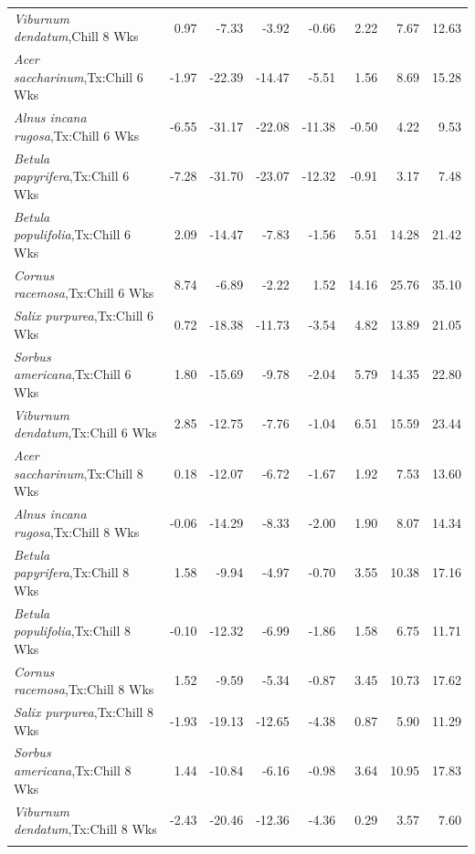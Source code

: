 \documentclass{article}\usepackage[]{graphicx}\usepackage[]{color}
\begin{document}
\begin{longtable}{lrrrrrrr}
  \textit{Viburnum dendatum},Chill 8 Wks & 0.97 & -7.33 & -3.92 & -0.66 & 2.22 & 7.67 & 12.63 \\ 
  \textit{Acer saccharinum},Tx:Chill 6 Wks & -1.97 & -22.39 & -14.47 & -5.51 & 1.56 & 8.69 & 15.28 \\ 
  \textit{Alnus incana rugosa},Tx:Chill 6 Wks & -6.55 & -31.17 & -22.08 & -11.38 & -0.50 & 4.22 & 9.53 \\ 
  \textit{Betula papyrifera},Tx:Chill 6 Wks & -7.28 & -31.70 & -23.07 & -12.32 & -0.91 & 3.17 & 7.48 \\ 
  \textit{Betula populifolia},Tx:Chill 6 Wks & 2.09 & -14.47 & -7.83 & -1.56 & 5.51 & 14.28 & 21.42 \\ 
  \textit{Cornus racemosa},Tx:Chill 6 Wks & 8.74 & -6.89 & -2.22 & 1.52 & 14.16 & 25.76 & 35.10 \\ 
  \textit{Salix purpurea},Tx:Chill 6 Wks & 0.72 & -18.38 & -11.73 & -3.54 & 4.82 & 13.89 & 21.05 \\ 
  \textit{Sorbus americana},Tx:Chill 6 Wks & 1.80 & -15.69 & -9.78 & -2.04 & 5.79 & 14.35 & 22.80 \\ 
  \textit{Viburnum dendatum},Tx:Chill 6 Wks & 2.85 & -12.75 & -7.76 & -1.04 & 6.51 & 15.59 & 23.44 \\ 
  \textit{Acer saccharinum},Tx:Chill 8 Wks & 0.18 & -12.07 & -6.72 & -1.67 & 1.92 & 7.53 & 13.60 \\ 
  \textit{Alnus incana rugosa},Tx:Chill 8 Wks & -0.06 & -14.29 & -8.33 & -2.00 & 1.90 & 8.07 & 14.34 \\ 
  \textit{Betula papyrifera},Tx:Chill 8 Wks & 1.58 & -9.94 & -4.97 & -0.70 & 3.55 & 10.38 & 17.16 \\ 
  \textit{Betula populifolia},Tx:Chill 8 Wks & -0.10 & -12.32 & -6.99 & -1.86 & 1.58 & 6.75 & 11.71 \\ 
  \textit{Cornus racemosa},Tx:Chill 8 Wks & 1.52 & -9.59 & -5.34 & -0.87 & 3.45 & 10.73 & 17.62 \\ 
  \textit{Salix purpurea},Tx:Chill 8 Wks & -1.93 & -19.13 & -12.65 & -4.38 & 0.87 & 5.90 & 11.29 \\ 
  \textit{Sorbus americana},Tx:Chill 8 Wks & 1.44 & -10.84 & -6.16 & -0.98 & 3.64 & 10.95 & 17.83 \\ 
  \textit{Viburnum dendatum},Tx:Chill 8 Wks & -2.43 & -20.46 & -12.36 & -4.36 & 0.29 & 3.57 & 7.60 \\ 
   \hline
\hline
\label{tab:suppmodht}
\end{longtable}
\end{document}
